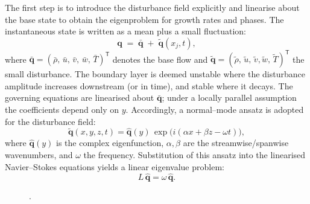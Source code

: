 The first step is to introduce the disturbance field explicitly and linearise about the base state to obtain the eigenproblem for growth rates and phases. The instantaneous state is written as a mean plus a small fluctuation:
\begin{equation}
  \boldsymbol{q} \;=\; \bar{\boldsymbol{q}}\;+\; \tilde{\boldsymbol{q}}(x_j,t),
\end{equation}
where $\bar{\boldsymbol{q}}=(\bar{\rho},\,\bar{u},\,\bar{v},\,\bar{w},\,\bar{T})^{\mathsf{T}}$ denotes the base flow and $\tilde{\boldsymbol{q}}=(\tilde{\rho},\,\tilde{u},\,\tilde{v},\tilde{w},\,\tilde{T})^{\mathsf{T}}$ the small disturbance. The boundary layer is deemed unstable where the disturbance amplitude increases downstream (or in time), and stable where it decays. The governing equations are linearised about $\bar{\boldsymbol{q}}$; under a locally parallel assumption the coefficients depend only on $y$. Accordingly, a normal--mode ansatz is adopted for the disturbance field:
\begin{equation}
  \tilde{\boldsymbol{q}}(x,y,z,t)
  = \hat{\boldsymbol{q}}(y)\,\exp\!\big(i(\alpha x+\beta z-\omega t)\big),
\end{equation}
where $\hat{\boldsymbol{q}}(y)$ is the complex eigenfunction, $\alpha,\beta$ are the streamwise/spanwise wavenumbers, and $\omega$ the frequency. Substitution of this ansatz into the linearised Navier--Stokes equations yields a linear eigenvalue problem:
\begin{equation*}
  L\,\hat{\boldsymbol{q}} = \omega\,\hat{\boldsymbol{q}}.
\end{equation*}


\begin{figure}[hbt!]
    \centering
    \fontsize{9}{10}\selectfont
    .
    \label{figure:schematicmackmode}
\end{figure}


